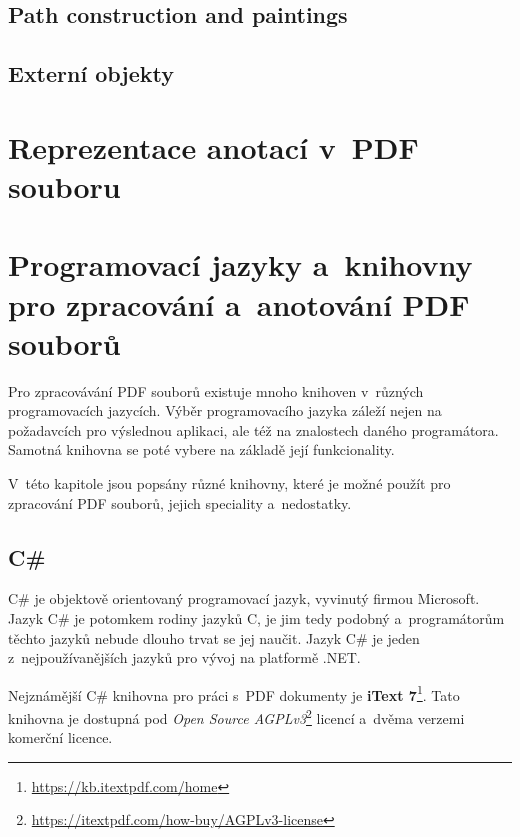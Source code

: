 \subsection*{Path construction and paintings }


\subsection*{Externí objekty}



\section{Reprezentace anotací v~PDF souboru}

\DummyText



\section{Programovací jazyky a~knihovny pro zpracování a~anotování PDF souborů}

Pro zpracovávání PDF souborů existuje mnoho knihoven v~různých programovacích
jazycích. Výběr programovacího jazyka záleží nejen na požadavcích pro výslednou
aplikaci, ale též na znalostech daného programátora. Samotná knihovna se poté
vybere na základě její funkcionality. 

V~této kapitole jsou popsány různé knihovny, které je možné použít pro zpracování
PDF souborů, jejich speciality a~nedostatky.


\subsection*{C\#}

C\# je objektově orientovaný programovací jazyk, vyvinutý firmou Microsoft.
Jazyk C\# je potomkem rodiny jazyků C, je jim tedy podobný a~programátorům těchto
jazyků nebude dlouho trvat se jej naučit. Jazyk C\# je jeden z~nejpoužívanějších
jazyků pro vývoj na platformě .NET.
\cite{CSharp}

Nejznámější C\# knihovna pro práci s~PDF dokumenty je \textbf{iText 7}\footnote{
\href{https://kb.itextpdf.com/home}{https://kb.itextpdf.com/home}
}. Tato knihovna je dostupná pod \emph{Open Source AGPLv3}\footnote{
\href{https://itextpdf.com/how-buy/AGPLv3-license}{https://itextpdf.com/how-buy/AGPLv3-license}
} licencí a~dvěma verzemi komerční licence. 

